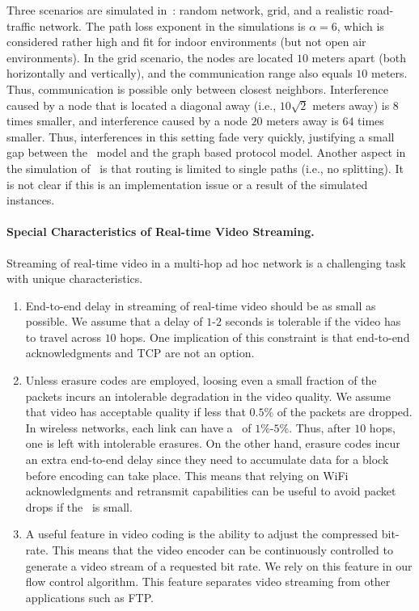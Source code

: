 \documentclass[12pt]{article}
\newenvironment{proof sketch}[1]{\noindent {\emph{Proof sketch of #1:}}}{\hfill \qed}
\newcommand{\SINR}{\text{\sc{sinr}}}
\newcommand{\PER}{\text{\sc{per}}}
\begin{document}
Three scenarios are simulated in~\cite{chafekarPhD}: random network,
grid, and a realistic road-traffic network. The path loss exponent in
the simulations is $\alpha=6$, which is considered rather high and fit
for indoor environments (but not open air environments). In the grid
scenario, the nodes are located $10$ meters apart (both horizontally
and vertically), and the communication range also equals $10$ meters.
Thus, communication is possible only between closest neighbors.
Interference caused by a node that is located a diagonal away (i.e.,
$10\sqrt{2}$ meters away) is $8$ times smaller, and interference
caused by a node $20$ meters away is $64$ times smaller. Thus,
interferences in this setting fade very quickly, justifying a small
gap between the \SINR\ model and the graph based protocol model.
Another aspect in the simulation of~\cite{chafekarPhD} is that routing
is limited to single paths (i.e., no splitting). It is not clear if
this is an implementation issue or a result of the simulated
instances.

\paragraph{Special Characteristics of Real-time Video Streaming.}
Streaming of real-time video in a multi-hop ad hoc network is a
challenging task with unique characteristics.
\begin{enumerate}[(1)]
\item End-to-end delay in streaming of real-time video should be as
  small as possible.  We assume that a delay of $1$-$2$ seconds is
  tolerable if the video has to travel across $10$ hops.  One
  implication of this constraint is that end-to-end acknowledgments and TCP are
  not an option.
\item Unless erasure codes are employed, loosing even a small fraction
  of the packets incurs an intolerable degradation in the video
  quality. We assume that video has acceptable quality if less that
  $0.5\%$ of the packets are dropped. In wireless networks, each link
  can have a \PER\ of $1\%$-$5\%$. Thus, after $10$ hops, one is left
  with intolerable erasures.  On the other hand, erasure codes incur an
  extra end-to-end delay since they need to accumulate data for a
  block before encoding can take place. This means that relying on
  WiFi acknowledgments and retransmit capabilities can be useful to
  avoid packet drops if the \PER\ is small.
\item A useful feature in video coding is the ability to adjust the
  compressed bit-rate. This means that the video encoder can be
  continuously controlled to generate a video stream of a requested
  bit rate. We rely on this feature in our flow control algorithm.
  This feature separates video streaming from other applications such
  as FTP.
\end{enumerate}
\end{document}
